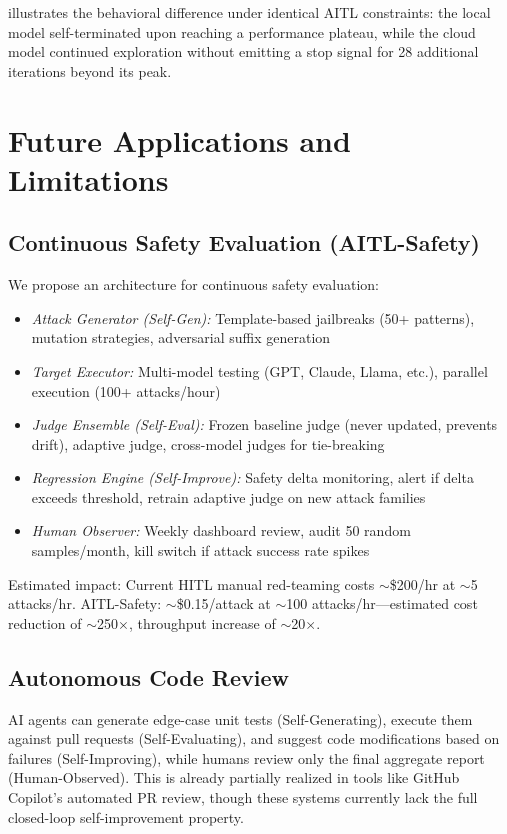 \documentclass[11pt]{article}
\begin{document}
 illustrates the behavioral difference under identical AITL constraints: the local model self-terminated upon reaching a performance plateau, while the cloud model continued exploration without emitting a stop signal for 28 additional iterations beyond its peak.

\section{Future Applications and Limitations}
\label{sec:future}

\subsection{Continuous Safety Evaluation (AITL-Safety)}

We propose an architecture for continuous safety evaluation:
\begin{itemize}[nosep]
  \item \emph{Attack Generator (Self-Gen):} Template-based jailbreaks (50+ patterns), mutation strategies, adversarial suffix generation
  \item \emph{Target Executor:} Multi-model testing (GPT, Claude, Llama, etc.), parallel execution (100+ attacks/hour)
  \item \emph{Judge Ensemble (Self-Eval):} Frozen baseline judge (never updated, prevents drift), adaptive judge, cross-model judges for tie-breaking
  \item \emph{Regression Engine (Self-Improve):} Safety delta monitoring, alert if delta exceeds threshold, retrain adaptive judge on new attack families
  \item \emph{Human Observer:} Weekly dashboard review, audit 50 random samples/month, kill switch if attack success rate spikes
\end{itemize}

Estimated impact: Current HITL manual red-teaming costs $\sim$\$200/hr at $\sim$5 attacks/hr. AITL-Safety: $\sim$\$0.15/attack at $\sim$100 attacks/hr---estimated cost reduction of $\sim$250$\times$, throughput increase of $\sim$20$\times$.

\subsection{Autonomous Code Review}

AI agents can generate edge-case unit tests (Self-Generating), execute them against pull requests (Self-Evaluating), and suggest code modifications based on failures (Self-Improving), while humans review only the final aggregate report (Human-Observed). This is already partially realized in tools like GitHub Copilot's automated PR review, though these systems currently lack the full closed-loop self-improvement property.
\end{document}

